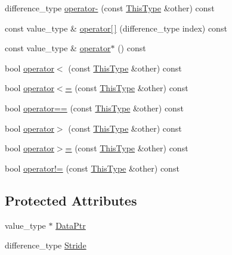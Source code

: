 \begin{DoxyCompactItemize}
\item 
difference\-\_\-type \hyperlink{classvct_var_stride_vector_const_iterator_aae3780e89870a862c5f94813ff14d757}{operator-\/} (const \hyperlink{classvct_var_stride_vector_const_iterator_afd99aad7dc756d227f4fb02cd569d00a}{This\-Type} \&other) const 
\item 
const value\-\_\-type \& \hyperlink{classvct_var_stride_vector_const_iterator_a209f66932b0e8685875ed025b2e60a6c}{operator\mbox{[}$\,$\mbox{]}} (difference\-\_\-type index) const 
\item 
const value\-\_\-type \& \hyperlink{classvct_var_stride_vector_const_iterator_af3a5a1e0eecb4c29c566ff1d96a96645}{operator$\ast$} () const 
\item 
bool \hyperlink{classvct_var_stride_vector_const_iterator_a11b71e83f918383967b42cd9063815b6}{operator$<$} (const \hyperlink{classvct_var_stride_vector_const_iterator_afd99aad7dc756d227f4fb02cd569d00a}{This\-Type} \&other) const 
\item 
bool \hyperlink{classvct_var_stride_vector_const_iterator_ac3633c404d3de1140235e6f7dfabd53d}{operator$<$=} (const \hyperlink{classvct_var_stride_vector_const_iterator_afd99aad7dc756d227f4fb02cd569d00a}{This\-Type} \&other) const 
\item 
bool \hyperlink{classvct_var_stride_vector_const_iterator_ab6f281665cc2181a31c27bc8ea64988d}{operator==} (const \hyperlink{classvct_var_stride_vector_const_iterator_afd99aad7dc756d227f4fb02cd569d00a}{This\-Type} \&other) const 
\item 
bool \hyperlink{classvct_var_stride_vector_const_iterator_aeec0e610900723af49a8532e8727efc8}{operator$>$} (const \hyperlink{classvct_var_stride_vector_const_iterator_afd99aad7dc756d227f4fb02cd569d00a}{This\-Type} \&other) const 
\item 
bool \hyperlink{classvct_var_stride_vector_const_iterator_ab790fe5a4cd924ef5606388eb4e20781}{operator$>$=} (const \hyperlink{classvct_var_stride_vector_const_iterator_afd99aad7dc756d227f4fb02cd569d00a}{This\-Type} \&other) const 
\item 
bool \hyperlink{classvct_var_stride_vector_const_iterator_ab4c7a8b61e07b37ad100b34784c6a3b8}{operator!=} (const \hyperlink{classvct_var_stride_vector_const_iterator_afd99aad7dc756d227f4fb02cd569d00a}{This\-Type} \&other) const 
\end{DoxyCompactItemize}
\subsection*{Protected Attributes}
\begin{DoxyCompactItemize}
\item 
value\-\_\-type $\ast$ \hyperlink{classvct_var_stride_vector_const_iterator_a0aed102854d3d3a2c15214f55640c1b2}{Data\-Ptr}
\item 
difference\-\_\-type \hyperlink{classvct_var_stride_vector_const_iterator_a0b2bb6ca56af29cbf73c6874e86c367e}{Stride}
\end{DoxyCompactItemize}



